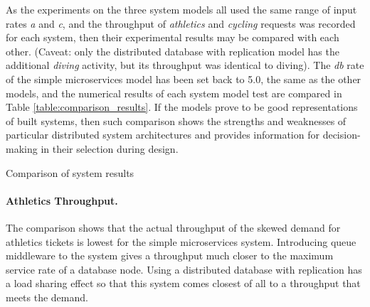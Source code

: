 \documentclass[runningheads]{llncs}
\begin{document}
As the experiments on the three system models all used the same range of input rates {\itshape a} and {\itshape c}, and the throughput of {\itshape athletics} and {\itshape cycling} requests was recorded for each system, then their experimental results may be compared with each other. (Caveat: only the distributed database with replication model has the additional {\itshape diving} activity, but its throughput was identical to diving).  The {\itshape db} rate of the simple microservices model has been set back to 5.0, the same as the other models, and the numerical results of each system model test are compared in Table \ref{table:comparison_results}.  If the models prove to be good representations of built systems, then such comparison shows the strengths and weaknesses of particular distributed system architectures and provides information for decision-making in their selection during design.

\begin{table}[h!]
	\centering
	\caption{Comparison of system results}
	\label{table:comparison_results}
\end{table}

\paragraph{Athletics Throughput.}  The comparison shows that the actual throughput of the skewed demand for athletics tickets is lowest for the simple microservices system.  Introducing queue middleware to the system gives a throughput much closer to the maximum service rate of a database node.  Using a distributed database with replication has a load sharing effect so that this system comes closest of all to a throughput that meets the demand.
\end{document}
